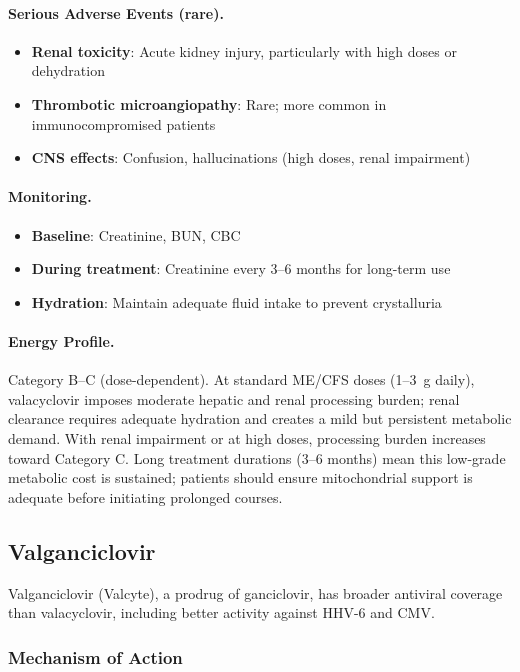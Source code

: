 \paragraph{Serious Adverse Events (rare).}
\begin{itemize}
    \item \textbf{Renal toxicity}: Acute kidney injury, particularly with high doses or dehydration
    \item \textbf{Thrombotic microangiopathy}: Rare; more common in immunocompromised patients
    \item \textbf{CNS effects}: Confusion, hallucinations (high doses, renal impairment)
\end{itemize}

\paragraph{Monitoring.}
\begin{itemize}
    \item \textbf{Baseline}: Creatinine, BUN, CBC
    \item \textbf{During treatment}: Creatinine every 3--6 months for long-term use
    \item \textbf{Hydration}: Maintain adequate fluid intake to prevent crystalluria
\end{itemize}

\paragraph{Energy Profile.}
Category B--C (dose-dependent). At standard ME/CFS doses (1--3~g daily), valacyclovir imposes moderate hepatic and renal processing burden; renal clearance requires adequate hydration and creates a mild but persistent metabolic demand. With renal impairment or at high doses, processing burden increases toward Category C. Long treatment durations (3--6 months) mean this low-grade metabolic cost is sustained; patients should ensure mitochondrial support is adequate before initiating prolonged courses.

\subsection{Valganciclovir}

Valganciclovir (Valcyte), a prodrug of ganciclovir, has broader antiviral coverage than valacyclovir, including better activity against HHV-6 and CMV.

\subsubsection{Mechanism of Action}

